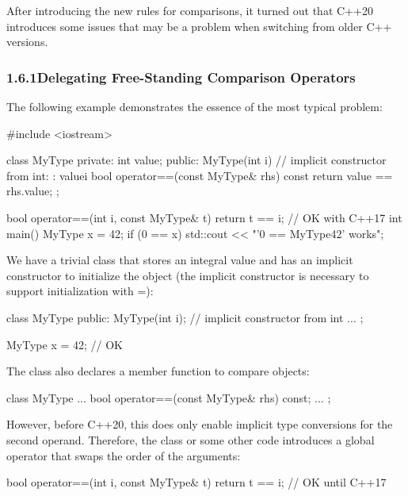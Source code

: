 
After introducing the new rules for comparisons, it turned out that C++20 introduces some issues that may be a problem when switching from older C++ versions.

\subsubsection*{ 1.6.1\hspace{0.2cm}Delegating Free-Standing Comparison Operators}

The following example demonstrates the essence of the most typical problem:


\begin{cpp}
#include <iostream>

class MyType {
private:
	int value;
public:
	MyType(int i) // implicit constructor from int:
		: value{i} {
	}
	bool operator==(const MyType& rhs) const {
		return value == rhs.value;
	}
};

bool operator==(int i, const MyType& t) {
	return t == i; // OK with C++17
}
int main()
{
	MyType x = 42;
	if (0 == x) {
		std::cout << "'0 == MyType{42}' works\n";
	}
}
\end{cpp}

We have a trivial class that stores an integral value and has an implicit constructor to initialize the object (the implicit constructor is necessary to support initialization with =):

\begin{cpp}
class MyType {
	public:
	MyType(int i); // implicit constructor from int
	...
};

MyType x = 42; // OK
\end{cpp}

The class also declares a member function to compare objects:

\begin{cpp}
class MyType {
	...
	bool operator==(const MyType& rhs) const;
	...
};
\end{cpp}

However, before C++20, this does only enable implicit type conversions for the second operand. Therefore, the class or some other code introduces a global operator that swaps the order of the arguments:

\begin{cpp}
bool operator==(int i, const MyType& t) {
	return t == i; // OK until C++17
}
\end{cpp}

